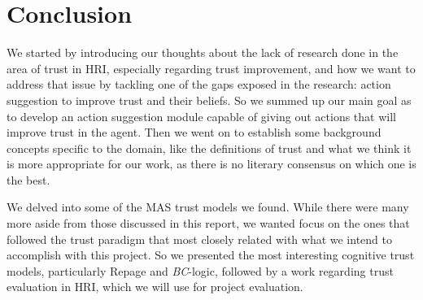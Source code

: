 \section{Conclusion}
\label{sec:Conclusion}
We started by introducing our thoughts about the lack of research done in the area of trust in \ac{HRI}, especially regarding trust improvement, and how we want to address that issue by tackling one of the gaps exposed in the research: action suggestion to improve trust and their beliefs. So we summed up our main goal as to develop an action suggestion module capable of giving out actions that will improve trust in the agent. Then we went on to establish some background concepts specific to the domain, like the definitions of trust and what we think it is more appropriate for our work, as there is no literary consensus on which one is the best. 

We delved into some of the \ac{MAS} trust models we found. While there were many more aside from those discussed in this report, we wanted focus on the ones that followed the trust paradigm that most closely related with what we intend to accomplish with this project. So we presented the most interesting cognitive trust models, particularly Repage and \textit{BC}-logic, followed by a work regarding trust evaluation in \ac{HRI}, which we will use for project evaluation.